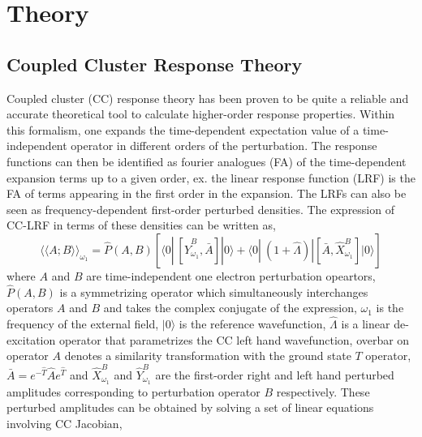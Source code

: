 \section{Theory}
\subsection{Coupled Cluster Response Theory}
Coupled cluster (CC) response theory has been proven to be quite a reliable and accurate theoretical
tool to calculate higher-order response properties\cite{}. Within this formalism,
one expands the time-dependent expectation value of a time-independent operator 
in different orders of the perturbation. The response functions can then be identified 
as fourier analogues (FA) of the time-dependent expansion terms up to a given order, ex. the
linear response function (LRF) is the FA of terms appearing in the first order in the
expansion. The LRFs can also be seen as frequency-dependent first-order perturbed densities. 
The expression of CC-LRF in terms of these densities can be written as\cite{},
\begin{equation}
{\langle\langle A;B\rangle\rangle}_{\omega_1} =  \hat{P}(A,B)[\langle 0 | \
[\hat{Y}^{B}_{\omega_1}, \bar{A}]|0\rangle + \langle 0 | \
(1 + \hat{\Lambda})|[\bar{A},\hat{X}^{B}_{\omega_1}]|0\rangle]
\end{equation}
where $A$ and $B$ are time-independent one electron perturbation opeartors,
$\hat{P}(A,B)$ is a symmetrizing operator which simultaneously interchanges 
operators $A$ and $B$ and takes the complex conjugate of the expression, $\omega_1$ 
is the frequency of the external field, $|0\rangle$ is the reference wavefunction, $\hat{\Lambda}$ is
a linear de-excitation operator that parametrizes the CC left hand wavefunction, 
overbar on operator $A$ denotes a similarity transformation with the ground state 
$T$ operator, $\bar{A} = e^{-\hat{T}}\hat{A}e^{\hat{T}}$
and $\hat{X}^{B}_{\omega_1}$ and $\hat{Y}^{B}_{\omega_1}$ are the first-order right and left 
hand perturbed amplitudes corresponding to perturbation operator $B$ respectively.
These perturbed amplitudes can be obtained by solving a set of linear equations involving
CC Jacobian,


